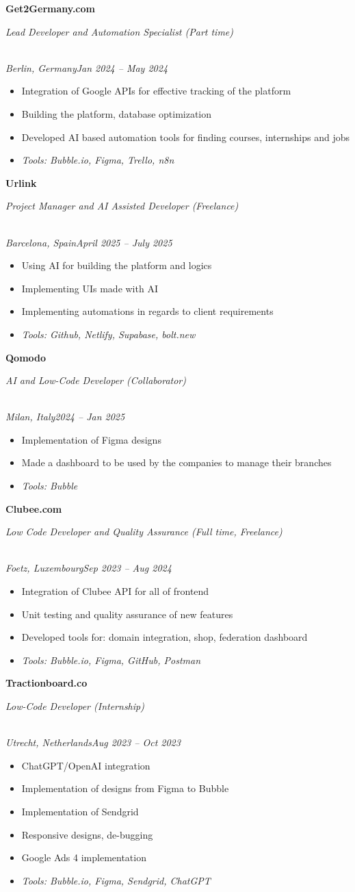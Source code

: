 \documentclass[a4paper,10pt]{article}
\newcommand{\role}[4]{\vspace{3pt}\noindent\hspace{0.6em}\parbox[t]{0.38\textwidth}{\raggedright\textbf{#1}}\hfill\parbox[t]{0.58\textwidth}{\raggedleft\textit{#2}}\\{\textit{#3}\hfill\textit{#4}}\vspace{1pt}}
\begin{document}
\role{Get2Germany.com}{Lead Developer and Automation Specialist (Part time)}{Berlin, Germany}{Jan 2024 -- May 2024}
\begin{itemize}
\item Integration of Google APIs for effective tracking of the platform
\item Building the platform, database optimization
\item Developed AI based automation tools for finding courses, internships and jobs
\item \textit{Tools: Bubble.io, Figma, Trello, n8n}
\end{itemize}

\role{Urlink}{Project Manager and AI Assisted Developer (Freelance)}{Barcelona, Spain}{April 2025 -- July 2025}
\begin{itemize}
\item Using AI for building the platform and logics
\item Implementing UIs made with AI
\item Implementing automations in regards to client requirements
\item \textit{Tools: Github, Netlify, Supabase, bolt.new}
\end{itemize}

\role{Qomodo}{AI and Low-Code Developer (Collaborator)}{Milan, Italy}{2024 -- Jan 2025}
\begin{itemize}
\item Implementation of Figma designs
\item Made a dashboard to be used by the companies to manage their branches
\item \textit{Tools: Bubble}
\end{itemize}

\role{Clubee.com}{Low Code Developer and Quality Assurance (Full time, Freelance)}{Foetz, Luxembourg}{Sep 2023 -- Aug 2024}
\begin{itemize}
\item Integration of Clubee API for all of frontend
\item Unit testing and quality assurance of new features
\item Developed tools for: domain integration, shop, federation dashboard
\item \textit{Tools: Bubble.io, Figma, GitHub, Postman}
\end{itemize}

\role{Tractionboard.co}{Low-Code Developer (Internship)}{Utrecht, Netherlands}{Aug 2023 -- Oct 2023}
\begin{itemize}
\item ChatGPT/OpenAI integration
\item Implementation of designs from Figma to Bubble
\item Implementation of Sendgrid
\item Responsive designs, de-bugging
\item Google Ads 4 implementation
\item \textit{Tools: Bubble.io, Figma, Sendgrid, ChatGPT}
\end{itemize}
\end{document}
